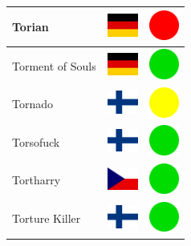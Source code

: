 \documentclass[12pt, a4paper, twoside]{report}
\begin{document}
\begin{center}
\begin{longtable}{|p{5cm}|p{2cm}|p{2cm}|}
 Torian                                                     & \includegraphics[width=1cm]{4x3/de} &   \includegraphics[width=1cm]{likes/n} \\ \hline
 Torment of Souls                                           & \includegraphics[width=1cm]{4x3/de} &   \includegraphics[width=1cm]{likes/y} \\ \hline
 Tornado                                                    & \includegraphics[width=1cm]{4x3/fi} &   \includegraphics[width=1cm]{likes/m} \\ \hline
 Torsofuck                                                  & \includegraphics[width=1cm]{4x3/fi} &   \includegraphics[width=1cm]{likes/y} \\ \hline
 Tortharry                                                  & \includegraphics[width=1cm]{4x3/cz} &   \includegraphics[width=1cm]{likes/y} \\ \hline
 Torture Killer                                             & \includegraphics[width=1cm]{4x3/fi} &   \includegraphics[width=1cm]{likes/y} \\ \hline

\end{longtable}
\end{center}
\end{document}

